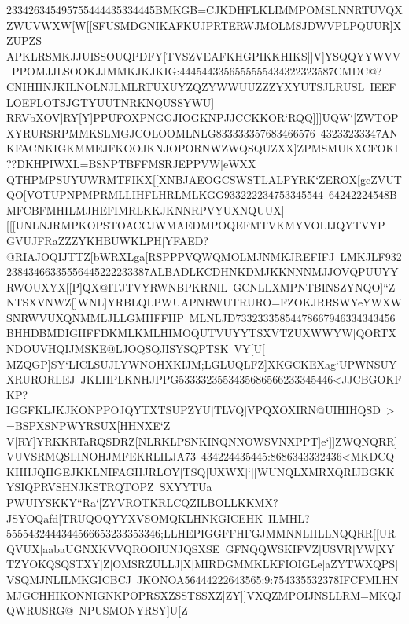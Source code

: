 {{{ 233426345495755444435334445BMKGB=CJKDHFLKLIMMPOMSLNNRTUVQXZWUVWXW[W[[SFUSMDGNIKAFKUJPRTERWJMOLMSJDWVPLPQUUR]XZUPZS%
 }
 \hbox{APKLRSMKJJUISSOUQPDFY[TVSZVEAFKHGPIKKHIKS]]V]YSQQYYWVV%
 PPOMJJLSOOKJJMMKJKJKIG:4445443356555555434322323587CMDC@?CNIHIINJKILNOLNJLMLRTUXUYZQZYWWUUZZZYXYUTSJLRUSL%
 IEEFLOEFLOTSJGTYUUTNRKNQUSSYWU]}
 \hbox{RRVbXOV]RY[Y]PPUFOXPNGGJIOGKNPJJCCKKOR`RQQ]]]UQW`[ZWTOPXYRURSRPMMKSLMGJCOLOOMLNLG833333357683466576%
 43233233347ANKFACNKIGKMMEJFKOOJKNJOPORNWZWQSQUZXX]ZPMSMUKXCFOKI??DKHPIWXL=BSNPTBFFMSRJEPPVW]eWXX%
 }
 \hbox{QTHPMPSUYUWRMTFIKX[[XNBJAEOGCSWSTLALPYRK`ZEROX[gcZVUTQO[VOTUPNPMPRMLLIHFLHRLMLKGG933222234753345544%
 64242224548BMFCBFMHILMJHEFIMRLKKJKNNRPVYUXNQUUX][[[UNLNJRMPKOPSTOACCJWMAEDMPOQEFMTVKMYVOLIJQYTVYP}
 \hbox{GVUJFRaZZZYKHBUWKLPH[YFAED?@RIAJOQIJTTZ[bWRXLga[RSPPPVQWQMOLMJNMKJREFIFJ%
 LMKJLF93223843466335556445222233387ALBADLKCDHNKDMJKKNNNMJJOVQPUUYYRWOUXYX[[P]QX@ITJTVYRWNBPKRNIL%
 GCNLLXMPNTBINSZYNQO]``Z}
 \hbox{NTSXVNWZ[]WNL]YRBLQLPWUAPNRWUTRURO=FZOKJRRSWYeYWXWSNRWVUXQNMMLJLLGMHFFHP%
 MLNLJD73323335854478667946334343456BHHDBMDIGIIFFDKMLKMLHIMOQUTVUYYTSXVTZUXWWYW[QORTXNDOUVHQIJMSKE@LJOQSQJISYSQPTSK%
 VY[U[}
 \hbox{MZQGP]SY`LICLSUJLYWNOHXKIJM;LGLUQLFZ]XKGCKEXag`UPWNSUYXRURORLEJ%
 JKLIIPLKNHJPPG5333323553435686566233345446<JJCBGOKFKP?IGGFKLJKJKONPPOJQYTXTSUPZYU[TLVQ[VPQXOXIRN@UIHIHQSD%
 >=BSPXSNPWYRSUX[HHNXE`Z}
 \hbox{V[RY]YRKKRTaRQSDRZ[NLRKLPSNKINQNNOWSVNXPPT]e`]]ZWQNQRR]VUVSRMQSLINOHJMFEKRLILJA73%
 434224435445:8686343332436<MKDCQKHHJQHGEJKKLNIFAGHJRLOY]TSQ[UXWX]`]]WUNQLXMRXQRIJBGKKYSIQPRVSHNJKSTRQTOPZ%
 SXYYTUa}
 \hbox{PWUIYSKKY``Ra`[ZYVROTKRLCQZILBOLLKKMX?JSYOQafd[TRUQOQYYXVSOMQKLHNKGICEHK%
 ILMHL?5555432444344566653233353346;LLHEPIGGFFHFGJMMNNLIILLNQQRR[[URQVUX[aabaUGNXKVVQROOIUNJQSXSE%
 GFNQQWSKIFVZ[USVR[YW]XY}
 \hbox{TZYOKQSQSTXY[Z]OMSRZULLJ]X]MIRDGMMKLKFIOIGLe]aZYTWXQPS[VSQMJNLILMKGICBCJ%
 JKONOA56444222643565:9:754335532378IFCFMLHNMJGCHHIKONNIGNKPOPRSXZSSTSSXZ]ZY]]VXQZMPOIJNSLLRM=MKQJQWRUSRG@%
 NPUSMONYRSY]U[Z}
}}
